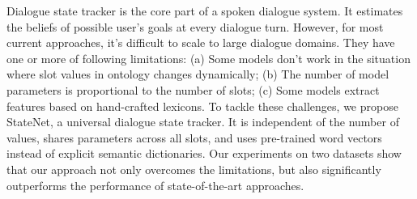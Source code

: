 Dialogue state tracker is the core part of a spoken dialogue system. It estimates the beliefs of possible user's goals at every dialogue turn. However, for most current approaches, it's difficult to scale to large dialogue domains. They have one or more of following limitations: (a) Some models don't work in the situation where slot values in ontology changes dynamically; (b) The number of model parameters is proportional to the number of slots; (c) Some models extract features based on hand-crafted lexicons. To tackle these challenges, we propose StateNet, a universal dialogue state tracker. It is independent of the number of values, shares parameters across all slots, and uses pre-trained word vectors instead of explicit semantic dictionaries. Our experiments on two datasets show that our approach not only overcomes the limitations, but also significantly outperforms the performance of state-of-the-art approaches.
